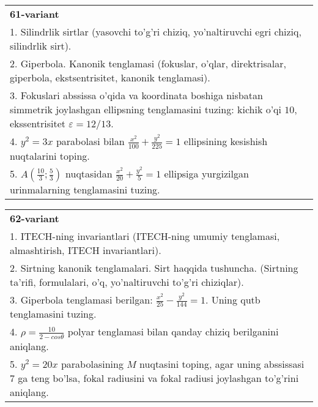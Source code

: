 \documentclass{article}
\begin{document}
\begin{tabular}{m{17cm}}
\textbf{61-variant}\\
1. Silindrlik sirtlar (yasovchi to'g'ri chiziq, yo'naltiruvchi egri chiziq, silindrlik sirt).\\

2. Giperbola. Kanonik tenglamasi (fokuslar, o'qlar, direktrisalar, giperbola, ekstsentrisitet, kanonik tenglamasi).\\

3. Fokuslari abssissa o'qida va koordinata boshiga nisbatan simmetrik joylashgan ellipsning tenglamasini tuzing: kichik o'qi $10$, ekssentrisitet $\varepsilon=12/13$.\\

4. $y^{2} = 3x$ parabolasi bilan $\frac{x^{2}}{100} + \frac{y^{2}}{225} = 1$ ellipsining kesishish nuqtalarini toping.  \\

5. $A(\frac{10}{3};\frac{5}{3})$ nuqtasidan $\frac{x^{2}}{20} + \frac{y^{2}}{5} = 1$ ellipsiga yurgizilgan urinmalarning tenglamasini tuzing.  
\end{tabular}
\vspace{1cm}


\begin{tabular}{m{17cm}}
\textbf{62-variant}\\
1. ITECH-ning invariantlari (ITECH-ning umumiy tenglamasi, almashtirish, ITECH invariantlari).\\

2. Sirtning kanonik tenglamalari. Sirt haqqida tushuncha. (Sirtning ta'rifi, formulalari, o'q, yo'naltiruvchi to'g'ri chiziqlar).\\

3. Giperbola tenglamasi berilgan: $\frac{x^{2}}{25}-\frac{y^{2}}{144}=1$. Uning qutb tenglamasini tuzing.\\

4. $\rho = \frac{10}{2 - cos\theta}$ polyar tenglamasi bilan qanday chiziq berilganini aniqlang.  \\

5. $y^{2} = 20x$ parabolasining $M$ nuqtasini toping, agar uning abssissasi 7 ga teng bo'lsa, fokal radiusini va fokal radiusi joylashgan to'g'rini aniqlang.
\end{tabular}
\vspace{1cm}
\end{document}
